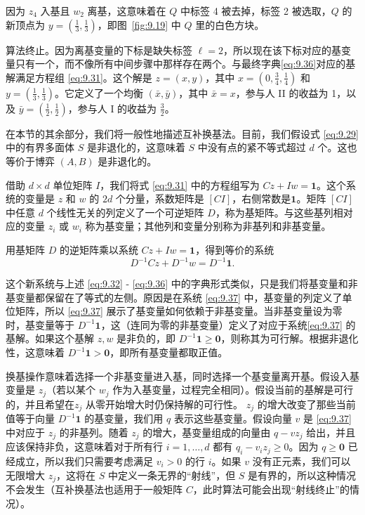 因为 \({z}_{4}\) 入基且 \({w}_{2}\) 离基，这意味着在 \(Q\) 中标签 4 被去掉，标签 2 被选取，\(Q\) 的新顶点为 \(y = \left( {\frac{1}{3},\frac{1}{3}}\right)\)，即图~\ref{fig:9.19} 中 \(Q\) 里的白色方块。


算法终止。因为离基变量的下标是缺失标签 \(\ell  = 2\)，所以现在该下标对应的基变量只有一个，而不像所有中间步骤中那样存在两个。与最终字典\eqref{eq:9.36}对应的基解满足方程组 \eqref{eq:9.31}。这个解是 \(z = \left( {x,y}\right)\)，其中 \(x = \left( {0,\frac{3}{4},\frac{1}{4}}\right)\) 和 \(y = \left( {\frac{1}{3},\frac{1}{3}}\right)\)。它定义了一个均衡 \(\left( {\bar{x},\bar{y}}\right)\)，其中 \(\bar{x} = x\)，参与人 II 的收益为 1，以及 \(\bar{y} = \left( {\frac{1}{2},\frac{1}{2}}\right)\)，参与人 I 的收益为 \(\frac{3}{2}\)。


在本节的其余部分，我们将一般性地描述互补换基法。目前，我们假设式 \eqref{eq:9.29} 中的有界多面体 \(S\) 是非退化的，这意味着 \(S\) 中没有点的紧不等式超过 \(d\) 个。这也等价于博弈 $(A, B)$ 是非退化的。


借助 \(d \times  d\) 单位矩阵 \(I\)，我们将式 \eqref{eq:9.31}  中的方程组写为 \({Cz} + {Iw} = \mathbf{1}\)。这个系统的变量是 \(z\) 和 \(w\) 的 \({2d}\) 个分量，系数矩阵是 \(\left\lbrack  {CI}\right\rbrack\)，右侧常数是$ \mathbf{1}$。矩阵 \(\left\lbrack  {CI}\right\rbrack\) 中任意 \(d\) 个线性无关的列定义了一个可逆矩阵 \(D\)，称为基矩阵。与这些基列相对应的变量 \({z}_{i}\) 或 \({w}_{i}\) 称为基变量；其他列和变量分别称为非基列和非基变量。

用基矩阵 \(D\) 的逆矩阵乘以系统 \({Cz} + {Iw} = \mathbf{1}\)，得到等价的系统
\begin{equation}
\label{eq:9.37}
{D}^{-1}{Cz} + {D}^{-1}w = {D}^{-1}\mathbf{1}.
\end{equation}

这个新系统与上述 \eqref{eq:9.32}  - \eqref{eq:9.36} 中的字典形式类似，只是我们将基变量和非基变量都保留在了等式的左侧。原因是在系统 \eqref{eq:9.37} 中，基变量的列定义了单位矩阵，所以 \eqref{eq:9.37} 展示了基变量如何依赖于非基变量。当非基变量设为零时，基变量等于 \({D}^{-1}\mathbf{1}\)，这（连同为零的非基变量）定义了对应于系统\eqref{eq:9.37} 的基解。如果这个基解 \(z,w\) 是非负的，即 \({D}^{-1}\mathbf{1} \geq  \mathbf{0}\)，则称其为可行解。根据非退化性，这意味着 \({D}^{-1}\mathbf{1} > \mathbf{0}\)，即所有基变量都取正值。


换基操作意味着选择一个非基变量进入基，同时选择一个基变量离开基。假设入基变量是 \({z}_{j}\)（若以某个 \({w}_{j}\) 作为入基变量，过程完全相同）。假设当前的基解是可行的，并且希望在\({z}_{j}\) 从零开始增大时仍保持解的可行性。 \({z}_{j}\) 的增大改变了那些当前值等于向量 \({D}^{-1}\mathbf{1}\) 的基变量，我们用 \(q\) 表示这些基变量。假设向量 \(v\) 是  \eqref{eq:9.37}  中对应于 \({z}_{j}\) 的非基列。随着 \({z}_{j}\) 的增大，基变量组成的向量由 \(q - v{z}_{j}\) 给出，并且应该保持非负，这意味着对于所有行 \(i = 1,\ldots,d\) 都有 \({q}_{i} - {v}_{i}{z}_{j} \geq  0\)。因为 \(q \geq  \mathbf{0}\) 已经成立，所以我们只需要考虑满足 \({v}_{i} > 0\) 的行 \(i\)。如果 \(v\) 没有正元素，我们可以无限增大 \({z}_{j}\)，这将在 \(S\) 中定义一条无界的“射线”，但 \(S\) 是有界的，所以这种情况不会发生（互补换基法也适用于一般矩阵 \(C\)，此时算法可能会出现“射线终止”的情况）。


